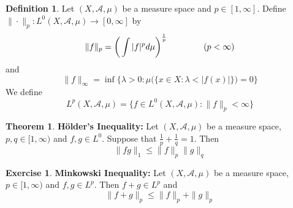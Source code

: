 \documentclass[12pt]{amsart}
\theoremstyle{definition}
\newtheorem{defn}[definition]{Definition}
\newtheorem{thm}[definition]{Theorem}
\newtheorem{ex}[definition]{Exercise}
\newcommand{\lam}{\lambda}
\newcommand{\MA}{\mathcal{A}}
\newcommand{\lex}[1]{\label{ex:#1}}
\newcommand{\ld}[1]{\label{defn:#1}}
\begin{document}
	\begin{defn} \ld{00000} 
		Let $(X, \MA, \mu)$ be a measure space and $p \in [1, \infty]$. Define $  \| \cdot \|_p : L^0(X, \MA, \mu) \rightarrow [0, \infty]$ by $$\|f \|_p = \bigg(\int \vert f \vert^p d\mu \bigg)^{\frac{1}{p}} \hspace{1.5cm}( p < \infty)$$ 
		and 
		$$\|f \|_{\infty} = \inf \bigg \{\lam >0: \mu\big(\{x \in X: \lam < \vert f(x) \vert  \}\big) = 0 \bigg \} $$
		We define $$L^p(X, \MA, \mu) =  \{f \in L^0(X, \MA, \mu): \|f \|_p < \infty \}$$
	\end{defn}
	
	\begin{thm}{\textbf{Hölder's Inequality:}}
		Let $(X, \MA, \mu)$ be a measure space, $p,q \in [1, \infty)$ and $f,g \in L^0$. Suppose that $\frac{1}{p} + \frac{1}{q} = 1$. Then $$\|fg\|_1 \leq \|f \|_p \|g \|_q$$
	\end{thm}
	
	\begin{ex} \lex{00000} \textbf{Minkowski Inequality:}
		Let $(X, \MA, \mu)$ be a measure space, $p \in [1, \infty)$ and $f,g \in L^p$. Then $f+g \in L^p$ and $$\|f+g\|_p  \leq \|f\|_p + \|g\|_p $$
	\end{ex}
	
\end{document}

